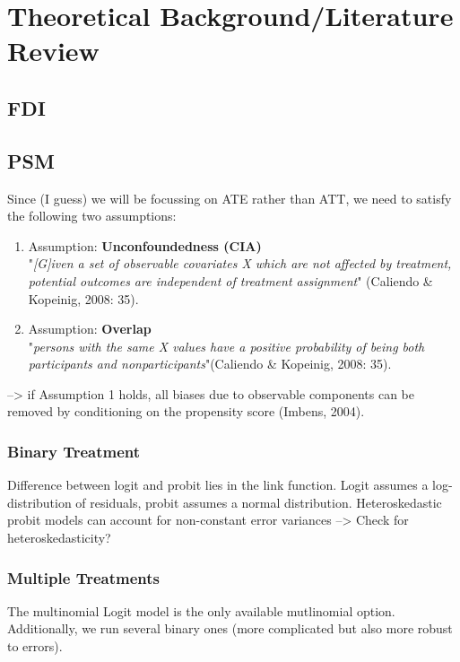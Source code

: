 \documentclass[a4paper,12pt]{scrartcl}
\begin{document}
\section{Theoretical Background/Literature Review}

\subsection{FDI}

\subsection{PSM}
Since (I guess) we will be focussing on ATE rather than ATT, we need to satisfy the following two assumptions: 

\begin{enumerate}
\item Assumption: \textbf{Unconfoundedness (CIA)} \\
"\textit{[G]iven a set of observable covariates X which are not affected by treatment, potential outcomes are independent of treatment assignment}" (Caliendo \& Kopeinig, 2008: 35).

\item Assumption: \textbf{Overlap} \\
"\textit{persons with the same X values have a positive probability of being both participants and nonparticipants}"(Caliendo \& Kopeinig, 2008: 35).

\end{enumerate}
--> if Assumption 1 holds, all biases due to observable components can be removed by conditioning on the propensity score (Imbens, 2004).

\subsubsection*{Binary Treatment}
Difference between logit and probit lies in the link function. Logit assumes a log-distribution of residuals, probit assumes a normal distribution. Heteroskedastic probit models can account for non-constant error variances --> Check for heteroskedasticity?

\subsubsection*{Multiple Treatments}
The multinomial Logit model is the only available mutlinomial option. Additionally, we run several binary ones (more complicated but also more robust to errors).
\end{document}
